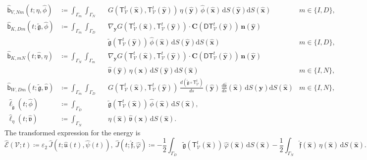 \documentclass{article}
\theoremstyle{remark}
\newcommand{\T}{\mathsf{T}}
\newcommand{\bbb}{\mathsf{b}}
\newcommand{\hatb}{\widehat{\bbb}}
\newcommand{\hatell}{\widehat{\ell}}
\newcommand{\dd}{\mathrm{d}}
\newcommand{\n}{\boldsymbol{n}}
\newcommand{\hatx}{\widehat{\boldsymbol{x}}}
\newcommand{\haty}{\widehat{\boldsymbol{y}}}
\newcommand{\argu}{\mathfrak{u}}
\newcommand{\argv}{\mathfrak{v}}
\newcommand{\argf}{\mathfrak{f}}
\newcommand{\argg}{\mathfrak{g}}
\newcommand{\tildeg}{\widetilde{\argg}}
\newcommand{\hatu}{\widehat{\argu}}
\newcommand{\hatv}{\widehat{\argv}}
\newcommand{\hatf}{\widehat{\argf}}
\newcommand{\hatpsi}{\widehat{\psi}}
\newcommand{\hatphi}{\widehat{\phi}}
\newcommand{\hatvphi}{\widehat{\varphi}}
\newcommand{\mat}[1]{\mathbf{#1}}
\newcommand{\Eps}{\mathcal{E}}
\newcommand{\hatEps}{\widehat{\Eps}}
\newcommand{\hatJ}{\widehat{J}}
\newcommand{\Nu}{\mathcal{V}}
\newcommand{\Tt}{\T_\Nu^t}
\newcommand{\DTt}{\mathsf{DT}_\Nu^t}
\newcommand{\CDTt}[1]{\mat{C}(\DTt({#1}))}
\begin{document}
\begin{equation}
\begin{aligned}
    \hatb_{V,Nm}(t;\eta,\hatphi)&\coloneqq\int_{\Gamma_m}\int_{\Gamma_N}&&G(\Tt(\hatx),\Tt(\haty))\,\eta(\haty)\,\hatphi(\hatx)\,\dd S(\haty)\dd S(\hatx)
    &m\in\{I,D\},\\
    \hatb_{K,Dm}(t;\tildeg,\hatphi)&\coloneqq\int_{\Gamma_m}\int_{\Gamma_D}&&\nabla_{\boldsymbol y}G(\Tt(\hatx),\Tt(\haty))\cdot\CDTt{\haty}\,\n(\haty)&\\
    &&&\tildeg(\Tt(\haty))\,\hatphi(\hatx)\,\dd S(\haty)\dd S(\hatx)
    &m\in\{I,D\},\\
    \hatb_{K,mN}(t;\hatv,\eta)&\coloneqq\int_{\Gamma_N}\int_{\Gamma_m}&&\nabla_{\boldsymbol y}G(\Tt(\hatx),\Tt(\haty))\cdot\CDTt{\haty}\,\n(\haty)&\\
    &&&\hatv(\haty)\,\eta(\hatx)\,\dd S(\haty)\dd S(\hatx)
    &m\in\{I,N\},\\
    \hatb_{W,Dm}(t;\tildeg,\hatv)&\coloneqq\int_{\Gamma_m}\int_{\Gamma_D}&&G(\Tt(\hatx),\Tt(\haty))\,\frac{d\left(\tildeg\circ\Tt\right)}{ds}(\haty)\,\frac{d\hatv}{ds}(\hatx)\,\dd S(\haty)\dd S(\hatx)
    &m\in\{I,N\},\\
    \hatell_{\tildeg}(t;\hatphi)&\coloneqq\int_{\Gamma_D}&&\tildeg(\Tt(\hatx))\,\hatphi(\hatx)\,\dd S(\hatx),&\\
    \hatell_{\eta}(t;\hatv)&\coloneqq\int_{\Gamma_N}&&\eta(\hatx)\,\hatv(\hatx)\,\dd S(\hatx).&
\end{aligned}
\end{equation}
The transformed expression for the energy is
\begin{equation}
    \hatEps(\Nu;t)\coloneqq\varepsilon_2\,\hatJ(t;\hatu(t),\hatpsi(t)),~\hatJ(t;\hatf,\hatvphi)\coloneqq-\frac{1}{2}\int_{\Gamma_D}\tildeg(\Tt(\hatx))\,\hatvphi(\hatx)\,\dd S(\hatx)-\frac{1}{2}\int_{\Gamma_N}\hatf(\hatx)\,\eta(\hatx)\,\dd S(\hatx).
\end{equation}
\end{document}
